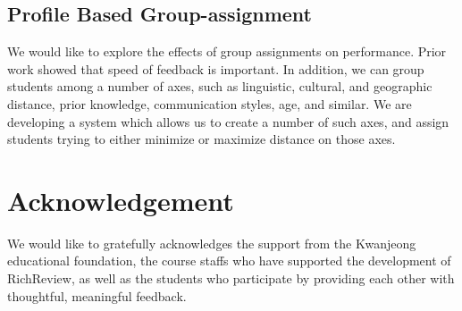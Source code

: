 \documentclass{sigchi}
\begin{document}
\subsection{Profile Based Group-assignment}
We would like to explore the effects of group assignments on performance. Prior work showed that speed of feedback is important. In addition, we can group students among a number of axes, such as linguistic, cultural, and geographic distance, prior knowledge, communication styles, age, and similar. We are developing a system which allows us to create a number of such axes, and assign students trying to either minimize or maximize distance on those axes.

\section{Acknowledgement} 
We would like to gratefully acknowledges the support from the Kwanjeong educational foundation, the course staffs who have supported the development of RichReview, as well as the students who participate by providing each other with thoughtful, meaningful feedback.



\end{document}
